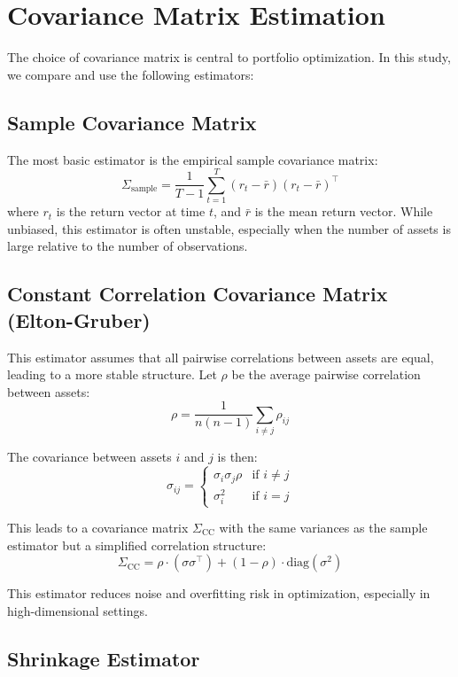 \documentclass{article}
\begin{document}
\newpage

\section{Covariance Matrix Estimation}

The choice of covariance matrix is central to portfolio optimization. In this study, we compare and use the following estimators:

\subsection{Sample Covariance Matrix}
\label{subsec:sample}

The most basic estimator is the empirical sample covariance matrix:
\[
\Sigma_{\text{sample}} = \frac{1}{T-1} \sum_{t=1}^{T} (r_t - \bar{r})(r_t - \bar{r})^\top
\]
where \( r_t \) is the return vector at time \( t \), and \( \bar{r} \) is the mean return vector. While unbiased, this estimator is often unstable, especially when the number of assets is large relative to the number of observations.

\subsection{Constant Correlation Covariance Matrix (Elton-Gruber)}

This estimator assumes that all pairwise correlations between assets are equal, leading to a more stable structure. Let \( \rho \) be the average pairwise correlation between assets:
\[
\rho = \frac{1}{n(n-1)} \sum_{i \neq j} \rho_{ij}
\]

The covariance between assets \( i \) and \( j \) is then:
\[
\sigma_{ij} =
\begin{cases}
    \sigma_i \sigma_j \rho & \text{if } i \neq j \\
    \sigma_i^2 & \text{if } i = j
\end{cases}
\]

This leads to a covariance matrix \( \Sigma_{\text{CC}} \) with the same variances as the sample estimator but a simplified correlation structure:
\[
\Sigma_{\text{CC}} = \rho \cdot (\sigma \sigma^\top) + (1 - \rho) \cdot \text{diag}(\sigma^2)
\]

This estimator reduces noise and overfitting risk in optimization, especially in high-dimensional settings.

\subsection{Shrinkage Estimator}
\end{document}
